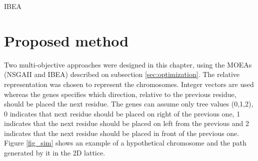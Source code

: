 \begin{algorithm}[htb!]
	\begin{algorithmic}[1]
	
	
		
		
		\EndWhile
	
	\EndWhile
	
	\end{algorithmic}
	\caption{IBEA}
	\label{alg:ibea}
\end{algorithm}




\section{Proposed method}
\label{sec:proposedMethod}


Two multi-objective approaches were designed in this chapter, using the MOEAs (NSGAII and IBEA) described on subsection \ref{sec:optimization}. The relative representation was chosen to represent the chromosomes. Integer vectors are used whereas the genes specifies which direction, relative to the previous residue, should be placed the next residue. The genes can assume only tree values (0,1,2), 0 indicates that next residue should be placed on right of the previous one, 1 indicates that the next residue should be placed on left from the previous and 2 indicates that the next residue should be placed in front of the previous one. Figure \ref{fig_sim} shows an example of a hypothetical chromosome and the path generated by it in the 2D lattice.

